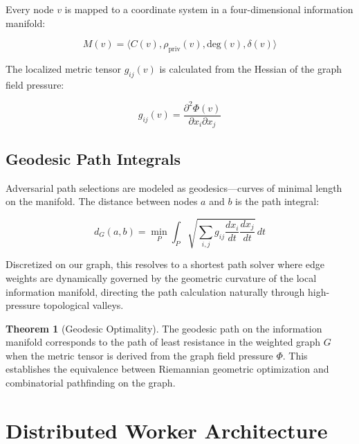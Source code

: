 \documentclass[11pt,a4paper]{article}
\theoremstyle{definition}
\newtheorem{theorem}{Theorem}[section]
\numberwithin{equation}{section}
\begin{document}
Every node $v$ is mapped to a coordinate system in a four-dimensional information manifold:

\begin{equation}\label{eq:manifold}
M(v) = \langle C(v), \rho_{\text{priv}}(v), \text{deg}(v), \delta(v) \rangle
\end{equation}

The localized metric tensor $g_{ij}(v)$ is calculated from the Hessian of the graph field pressure:

\begin{equation}\label{eq:metric-tensor}
g_{ij}(v) = \frac{\partial^2 \Phi(v)}{\partial x_i \partial x_j}
\end{equation}

\subsection{Geodesic Path Integrals}\label{subsec:geodesics}

Adversarial path selections are modeled as geodesics---curves of minimal length on the manifold. The distance between nodes $a$ and $b$ is the path integral:

\begin{equation}\label{eq:geodesic}
d_G(a, b) = \min_P \int_P \sqrt{\sum_{i,j} g_{ij} \frac{dx_i}{dt} \frac{dx_j}{dt}} \, dt
\end{equation}

Discretized on our graph, this resolves to a shortest path solver where edge weights are dynamically governed by the geometric curvature of the local information manifold, directing the path calculation naturally through high-pressure topological valleys.

\begin{theorem}[Geodesic Optimality]\label{thm:geodesic}
The geodesic path on the information manifold corresponds to the path of least resistance in the weighted graph $G$ when the metric tensor is derived from the graph field pressure $\Phi$. This establishes the equivalence between Riemannian geometric optimization and combinatorial pathfinding on the graph.
\end{theorem}

\section{Distributed Worker Architecture}\label{sec:workers}
\end{document}
